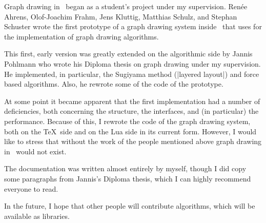 Graph drawing in \tikzname\ began as a student's project under my supervision.
Ren\'ee Ahrens, Olof-Joachim Frahm, Jens Kluttig, Matthias Schulz, and Stephan
Schuster wrote the first prototype of a graph drawing system inside \tikzname\
that uses  for the implementation of graph drawing algorithms.

This first, early version was greatly extended on the algorithmic side by
Jannis Pohlmann who wrote his Diploma thesis on graph drawing under my
supervision. He implemented, in particular, the Sugiyama method
(|layered layout|) and force based algorithms. Also, he rewrote some of the
code of the prototype.

At some point it became apparent that the first implementation had a number of
deficiencies, both concerning the structure, the interfaces, and (in
particular) the performance. Because of this, I rewrote the code of the graph
drawing system, both on the \TeX\ side and on the Lua side in its current form.
However, I would like to stress that without the work of the people mentioned
above graph drawing in \tikzname\ would not exist.

The documentation was written almost entirely by myself, though I did copy some
paragraphs from Jannis's Diploma thesis, which I can highly recommend everyone
to read.

In the future, I hope that other people will contribute algorithms, which will
be available as libraries.
